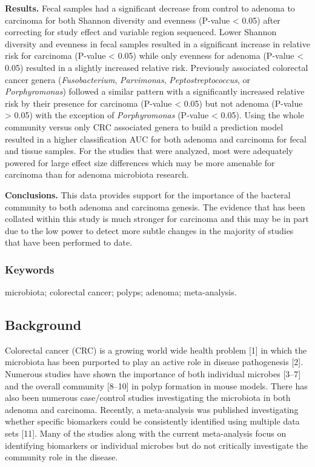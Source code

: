 \documentclass[12pt,]{article}
\begin{document}
\textbf{Results.} Fecal samples had a significant decrease from control
to adenoma to carcinoma for both Shannon diversity and evenness (P-value
\textless{} 0.05) after correcting for study effect and variable region
sequenced. Lower Shannon diversity and evenness in fecal samples
resulted in a significant increase in relative risk for carcinoma
(P-value \textless{} 0.05) while only evenness for adenoma (P-value
\textless{} 0.05) resulted in a slightly increased relative risk.
Previously associated colorectal cancer genera (\emph{Fusobacterium},
\emph{Parvimonas}, \emph{Peptostreptococcus}, or \emph{Porphyromonas})
followed a similar pattern with a significantly increased relative risk
by their presence for carcinoma (P-value \textless{} 0.05) but not
adenoma (P-value \textgreater{} 0.05) with the exception of
\emph{Porphyromonas} (P-value \textless{} 0.05). Using the whole
community versus only CRC associated genera to build a prediction model
resulted in a higher classification AUC for both adenoma and carcinoma
for fecal and tissue samples. For the studies that were analyzed, most
were adequately powered for large effect size differences which may be
more amenable for carcinoma than for adenoma microbiota research.

\textbf{Conclusions.} This data provides support for the importance of
the bacteral community to both adenoma and carcinoma genesis. The
evidence that has been collated within this study is much stronger for
carcinoma and this may be in part due to the low power to detect more
subtle changes in the majority of studies that have been performed to
date.

\subsubsection{Keywords}\label{keywords}

microbiota; colorectal cancer; polyps; adenoma; meta-analysis.

\newpage

\subsection{Background}\label{background}

Colorectal cancer (CRC) is a growing world wide health problem {[}1{]}
in which the microbiota has been purported to play an active role in
disease pathogenesis {[}2{]}. Numerous studies have shown the importance
of both individual microbes {[}3--7{]} and the overall community
{[}8--10{]} in polyp formation in mouse models. There has also been
numerous case/control studies investigating the microbiota in both
adenoma and carcinoma. Recently, a meta-analysis was published
investigating whether specific biomarkers could be consistently
identified using multiple data sets {[}11{]}. Many of the studies along
with the current meta-analysis focus on identifying biomarkers or
individual microbes but do not critically investigate the community role
in the disease.
\end{document}
